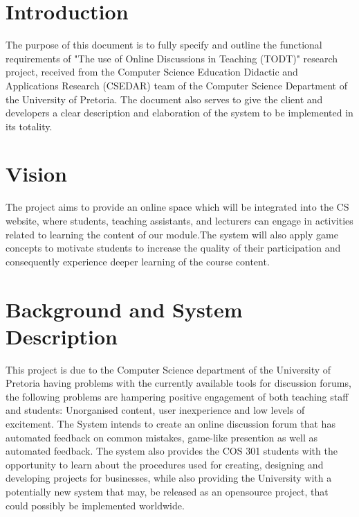 \documentclass[11pt]{article}
\begin{document}


\tableofcontents	%
\newpage


\section{Introduction}

The purpose of this document is to fully specify and outline the functional requirements of "The use of Online Discussions in Teaching (TODT)" research project, received from the Computer Science Education Didactic and Applications Research (CSEDAR) team of the Computer Science Department of the University of Pretoria. The document also serves to give the client and developers a clear description and elaboration of the system to be implemented in its totality.

\section{Vision}

The project aims to provide an online space which will be integrated into the CS website, where students, teaching assistants, and lecturers can engage in activities
related to learning the content of our module.The system will also apply game concepts to motivate students to increase the quality of their participation and consequently experience deeper learning of the course content.

\section{Background and System Description}

This project is due to the Computer Science department of the University of Pretoria having problems with the currently available tools for discussion forums, the following
problems are hampering positive engagement of both teaching staff and students: Unorganised content, user inexperience and  low levels of excitement.
\newline
The System intends to create an online discussion forum that has automated feedback on common mistakes, game-like presention as well as automated feedback. The system also provides the COS 301 students with the opportunity to learn about the procedures used for creating, designing and developing projects for businesses, while also providing the University with a potentially new system that may, be released as an opensource project, that could possibly be implemented worldwide.
\end{document}
